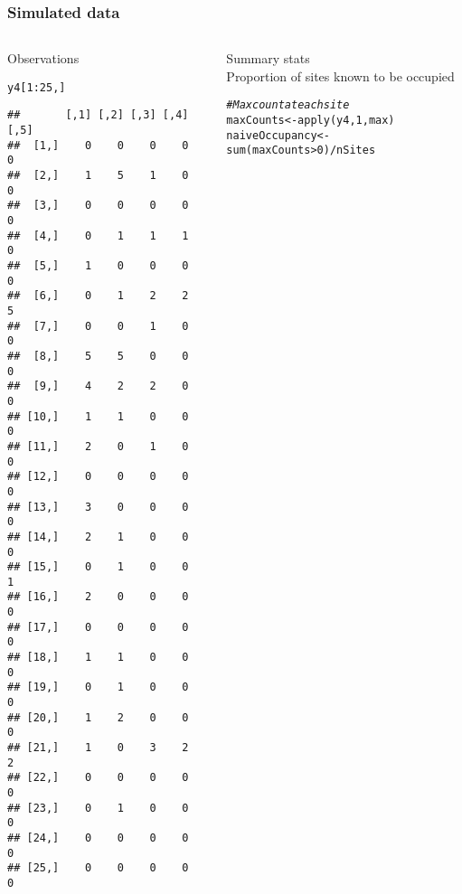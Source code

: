 \documentclass[color=usenames,dvipsnames]{beamer}\usepackage[]{graphicx}\usepackage[]{xcolor}
\makeatletter
\newcommand{\hlnum}[1]{\textcolor[rgb]{0.69,0.494,0}{#1}}%
\newcommand{\hlcom}[1]{\textcolor[rgb]{0.514,0.506,0.514}{\textit{#1}}}%
\newcommand{\hlopt}[1]{\textcolor[rgb]{0,0,0}{#1}}%
\newcommand{\hlstd}[1]{\textcolor[rgb]{0,0,0}{#1}}%
\newcommand{\hlkwb}[1]{\textcolor[rgb]{0,0.341,0.682}{#1}}%
\newcommand{\hlkwd}[1]{\textcolor[rgb]{0.004,0.004,0.506}{#1}}%
\newenvironment{kframe}{%
 \def\at@end@of@kframe{}%
 \ifinner\ifhmode%
  \def\at@end@of@kframe{\end{minipage}}%
  \begin{minipage}{\columnwidth}%
 \fi\fi%
 \def\FrameCommand##1{\hskip\@totalleftmargin \hskip-\fboxsep
 \colorbox{shadecolor}{##1}\hskip-\fboxsep
     \hskip-\linewidth \hskip-\@totalleftmargin \hskip\columnwidth}%
 \MakeFramed {\advance\hsize-\width
   \@totalleftmargin\z@ \linewidth\hsize
   \@setminipage}}%
 {\par\unskip\endMakeFramed%
 \at@end@of@kframe}
\newenvironment{knitrout}{}{} %
\makeatother
\begin{document}
\begin{frame}[fragile]
  \frametitle{Simulated data}
  \begin{columns}
    \begin{column}{0.4\textwidth}
      \small
      Observations
  \vspace{-6pt}
\begin{knitrout}\tiny
{}\color{fgcolor}\begin{kframe}
\begin{alltt}
\hlstd{y4[}\hlnum{1}\hlopt{:}\hlnum{25}\hlstd{,]}
\end{alltt}
\begin{verbatim}
##       [,1] [,2] [,3] [,4] [,5]
##  [1,]    0    0    0    0    0
##  [2,]    1    5    1    0    0
##  [3,]    0    0    0    0    0
##  [4,]    0    1    1    1    0
##  [5,]    1    0    0    0    0
##  [6,]    0    1    2    2    5
##  [7,]    0    0    1    0    0
##  [8,]    5    5    0    0    0
##  [9,]    4    2    2    0    0
## [10,]    1    1    0    0    0
## [11,]    2    0    1    0    0
## [12,]    0    0    0    0    0
## [13,]    3    0    0    0    0
## [14,]    2    1    0    0    0
## [15,]    0    1    0    0    1
## [16,]    2    0    0    0    0
## [17,]    0    0    0    0    0
## [18,]    1    1    0    0    0
## [19,]    0    1    0    0    0
## [20,]    1    2    0    0    0
## [21,]    1    0    3    2    2
## [22,]    0    0    0    0    0
## [23,]    0    1    0    0    0
## [24,]    0    0    0    0    0
## [25,]    0    0    0    0    0
\end{verbatim}
\end{kframe}
\end{knitrout}
  \end{column}
  \begin{column}{0.6\textwidth}
    \pause
    {\centering Summary stats \\}
    \vspace{24pt}
    \small
    Proportion of sites known to be occupied
    \vspace{-6pt}
\begin{knitrout}\scriptsize
{}\color{fgcolor}\begin{kframe}
\begin{alltt}
\hlcom{# Max count at each site}
\hlstd{maxCounts} \hlkwb{<-} \hlkwd{apply}\hlstd{(y4,} \hlnum{1}\hlstd{, max)}
\hlstd{naiveOccupancy} \hlkwb{<-} \hlkwd{sum}\hlstd{(maxCounts}\hlopt{>}\hlnum{0}\hlstd{)}\hlopt{/}\hlstd{nSites}

\end{alltt}
\end{kframe}
\end{knitrout}
\end{column}
\end{columns}
\end{frame}
\end{document}
